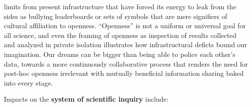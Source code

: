 \begin{itemize}
  limits from present infrastructure that have forced its energy to leak
  from the sides as bullying leaderboards or sets of symbols that are
  mere signifiers of cultural affiliation to openness. ``Openness'' is
  not a uniform or universal goal for all science, and even the framing
  of openness as inspection of results collected and analyzed in private
  isolation illustrates how infrastructural deficts bound our
  imagination. Our dreams can be bigger than being able to police each
  other's data, towards a more continuously collaborative process that
  renders the need for post-hoc openness irrelevant with mutually
  beneficial information sharing baked into every stage.
\end{itemize}

Impacts on the \textbf{system of scientific inquiry} include:

